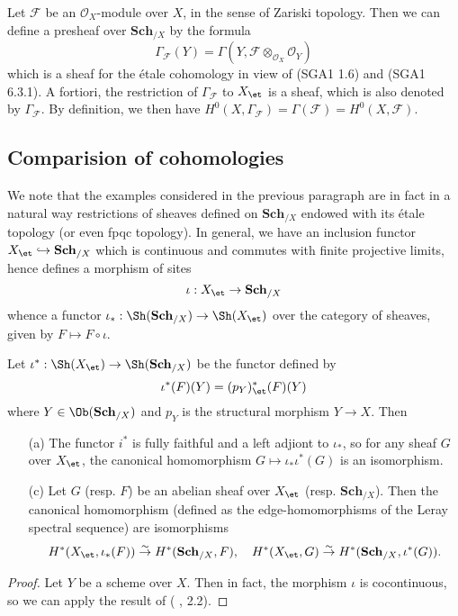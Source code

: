 \begin{example}\label{scheme etale sheaf induced by O_X module}
Let $\mathscr{F}$ be an $\mathscr{O}_X$-module over $X$, in the sense of Zariski topology. Then we can define a presheaf over $\mathbf{Sch}_{/X}$ by the formula
\[\Gamma_\mathscr{F}(Y)=\Gamma(Y,\mathscr{F}\otimes_{\mathscr{O}_X}\mathscr{O}_{Y})\]
which is a sheaf for the \'etale cohomology in view of (SGA1  1.6) and (SGA1  6.3.1). A fortiori, the restriction of $\Gamma_\mathscr{F}$ to $X_\et$ is a sheaf, which is also denoted by $\Gamma_\mathscr{F}$. By definition, we then have $H^0(X,\Gamma_\mathscr{F})=\Gamma(\mathscr{F})=H^0(X,\mathscr{F})$.
\end{example}

\subsection{Comparision of cohomologies}
We note that the examples considered in the previous paragraph are in fact in a natural way restrictions of sheaves defined on $\mathbf{Sch}_{/X}$ endowed with its \'etale topology (or even fpqc topology). In general, we have an inclusion functor $X_\et\hookrightarrow\mathbf{Sch}_{/X}$ which is continuous and commutes with finite projective limits, hence defines a morphism of sites
\[\iota:X_\et\to\mathbf{Sch}_{/X}\]
whence a functor $\iota_*:\Sh(\mathbf{Sch}_{/X})\to\Sh(X_\et)$ over the category of sheaves, given by $F\mapsto F\circ\iota$.
\begin{proposition}\label{scheme cohomology X_et and Sch_X comparision}
Let $\iota^*:\Sh(X_\et)\to\Sh(\mathbf{Sch}_{/X})$ be the functor defined by
\[\iota^*(F)(Y)=(p_Y)_\et^*(F)(Y)\]
where $Y\in\Ob(\mathbf{Sch}_{/X})$ and $p_Y$ is the structural morphism $Y\to X$. Then
\begin{enumerate}
    \item[(a)] The functor $i^*$ is fully faithful and a left adjiont to $\iota_*$, so for any sheaf $G$ over $X_\et$, the canonical homomorphism $G\mapsto \iota_*\iota^*(G)$ is an isomorphism.
    \item[(c)] Let $G$ (resp. $F$) be an abelian sheaf over $X_\et$ (resp. $\mathbf{Sch}_{/X}$). Then the canonical homomorphism (defined as the edge-homomorphisms of the Leray spectral sequence) are isomorphisms
\begin{gather*}
H^*(X_\et,\iota_*(F))\stackrel{\sim}{\to} H^*(\mathbf{Sch}_{/X},F),\quad H^*(X_\et,G)\stackrel{\sim}{\to} H^*(\mathbf{Sch}_{/X},\iota^*(G)).
\end{gather*}
\end{enumerate}
\end{proposition}
\begin{proof}
Let $Y$ be a scheme over $X$. Then in fact, the morphism $\iota$ is cocontinuous, so we can apply the result of (\cite{SGA4-1} , 2.2).
\end{proof}

